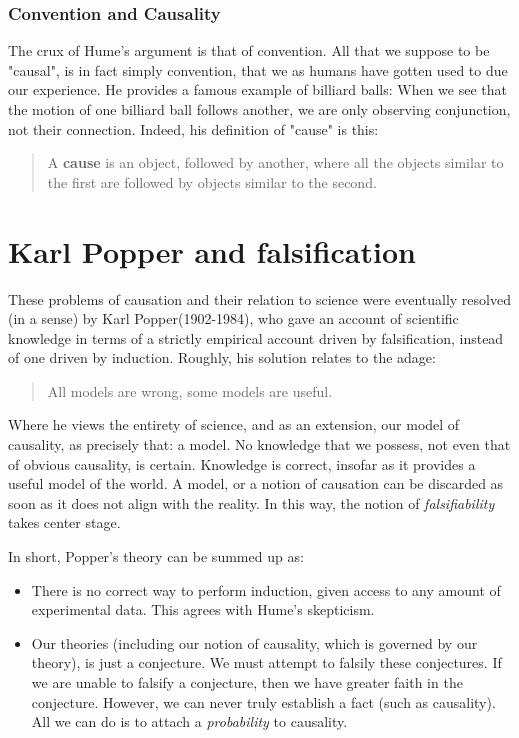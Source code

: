 \documentclass{article}
\begin{document}
\subsubsection{Convention and Causality}
The crux of Hume's argument is that of convention. All that we suppose to be
"causal", is in fact simply convention, that we as humans have gotten used to
due our experience. He provides a famous example of billiard balls: When we see
that the motion of one billiard ball follows another, we are only observing
conjunction, not their connection. Indeed, his definition of "cause" is this:
\begin{quote} A \textbf{cause} is an object, followed by another, where all the
objects similar to the first are followed by objects similar to the second.
\end{quote}




\section{Karl Popper and falsification} 

These problems of causation and their
relation to science were eventually resolved (in a sense) by Karl
Popper(1902-1984), who gave an account of scientific knowledge in terms of a
strictly empirical account driven by falsification, instead of one driven by
induction. Roughly, his solution relates to the adage: \begin{quotation} All
models are wrong, some models are useful.  \end{quotation}

Where he views the entirety of science, and as an extension, our model of
causality, as precisely that: a model. No knowledge that we possess, not even
that of obvious causality, is certain. Knowledge is correct, insofar as it
provides a useful model of the world. A model, or a notion of causation can be
discarded as soon as it does not align with the reality. In this way, the
notion of \emph{falsifiability} takes center stage.

In short, Popper's theory can be summed up as:
\begin{itemize}
    \item There is no correct way to perform induction, given access to any amount
        of experimental data. This agrees with Hume's skepticism.
    \item Our theories (including our notion of causality, which is governed by our theory), is
        just a conjecture. We must attempt to falsily these conjectures. If we
        are unable to falsify a conjecture, then we have greater faith in the conjecture. However,
        we can never truly establish a fact (such as causality). All we can do
        is to attach a \emph{probability} to causality.
\end{itemize}
\end{document}
